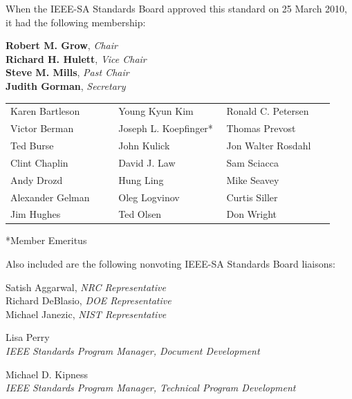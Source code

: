 \thispagestyle{front}
\begingroup
\fontsize{8.7}{10.25}\selectfont
\setlength{\parskip}{7.0pt plus .4pt minus .4pt}
When the IEEE-SA Standards Board approved this standard on 25 March 2010, it had the following membership:

\begin{center}
    {\bfseries Robert M. Grow}, \textit{Chair}\\
{\bfseries Richard H. Hulett}, \textit{Vice Chair}\\
{\bfseries Steve M. Mills}, \textit{Past Chair}\\
{\bfseries Judith Gorman}, \textit{Secretary}
\end{center}
\vspace{-4pt}

{\fontsize{8.25}{9.4}\selectfont
\renewcommand{\arraystretch}{1.0}
    \begin{tabular}{@{}Y{0.31\linewidth}Y{0.31\linewidth}Y{0.31\linewidth}@{}}
        Karen Bartleson  & Young Kyun Kim        & Ronald C. Petersen \\
        Victor Berman    & Joseph L. Koepfinger* & Thomas Prevost     \\
        Ted Burse        & John Kulick           & Jon Walter Rosdahl \\
        Clint Chaplin    & David J. Law          & Sam Sciacca        \\
        Andy Drozd       & Hung Ling             & Mike Seavey        \\
        Alexander Gelman & Oleg Logvinov         & Curtis Siller      \\
        Jim Hughes       & Ted Olsen             & Don Wright         \\
    \end{tabular}}

\vspace{7pt}
*Member Emeritus

\vspace{15pt}
Also included are the following nonvoting IEEE-SA Standards Board liaisons:

\begin{center}
    Satish Aggarwal, \textit{NRC Representative}\\
    Richard DeBlasio, \textit{DOE Representative}\\
    Michael Janezic, \textit{NIST Representative}

    \vspace{10pt}
    Lisa Perry\\
    \textit{IEEE Standards Program Manager, Document Development}

    \vspace{10pt}
    Michael D. Kipness\\
    \textit{IEEE Standards Program Manager, Technical Program Development}
\end{center}
\endgroup
\clearpage
